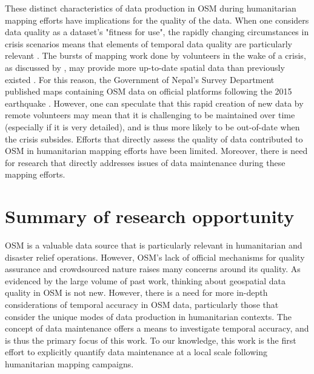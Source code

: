 These distinct characteristics of data production in OSM during humanitarian mapping efforts have implications for the quality of the data. When one considers data quality as a dataset’s "fitness for use", the rapidly changing circumstances in crisis scenarios means that elements of temporal data quality are particularly relevant \parencite{chen_coordination_2008}. The bursts of mapping work done by volunteers in the wake of a crisis, as discussed by \textcite{dittus_mass_2017}, may provide more up-to-date spatial data than previously existed \parencite{soden_crowdsourced_2014}. For this reason, the Government of Nepal’s Survey Department published maps containing OSM data on official platforms following the 2015 earthquake \parencite{soden_infrastructure_2016}. However, one can speculate that this rapid creation of new data by remote volunteers may mean that it is challenging to be maintained over time (especially if it is very detailed), and is thus more likely to be out-of-date when the crisis subsides. Efforts that directly assess the quality of data contributed to OSM in humanitarian mapping efforts have been limited. Moreover, there is need for research that directly addresses issues of data maintenance during these mapping efforts. 

\section{Summary of research opportunity}

OSM is a valuable data source that is particularly relevant in humanitarian and disaster relief operations. However, OSM’s lack of official mechanisms for quality assurance and crowdsourced nature raises many concerns around its quality. As evidenced by the large volume of past work, thinking about geospatial data quality in OSM is not new. However, there is a need for more in-depth considerations of temporal accuracy in OSM data, particularly those that consider the unique modes of data production in humanitarian contexts. The concept of data maintenance offers a means to investigate temporal accuracy, and is thus the primary focus of this work. To our knowledge, this work is the first effort to explicitly quantify data maintenance at a local scale following humanitarian mapping campaigns. 